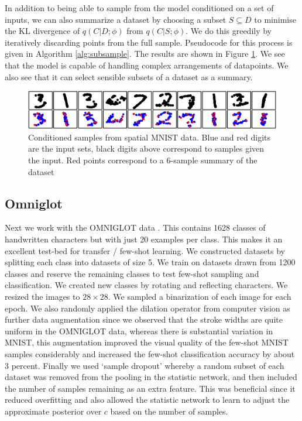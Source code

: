 \documentclass{article} %
\begin{document}
In addition to being able to sample from the model conditioned on a set of inputs, we can also summarize a dataset by choosing a subset $S \subseteq D$ to minimise the KL divergence of $q(C | D ;\phi)$ from $q(C | S; \phi)$. We do this greedily by iteratively discarding points from the full sample. Pseudocode for this process is given in Algorithm \ref{alg:subsample}.
The results are shown in Figure \ref{fig:spatial_mnist_examples}. We see that the model is capable of handling complex arrangements of datapoints. We also see that it can select sensible subsets of a dataset as a summary. 
\begin{figure}
\centering
\includegraphics[width=\linewidth]{spatial_mnist_summary_and_sample.png}
\vspace{-1.5em}
\caption{Conditioned samples from spatial MNIST data. Blue and red digits are the input sets, black digits above correspond to samples given the input. Red points correspond to a $6$-sample summary of the dataset \label{fig:spatial_mnist_examples}}
\end{figure}


\subsection{Omniglot}
Next we work with the OMNIGLOT data \citep{omniglot}. This contains 1628 classes of handwritten characters but with just 20 examples per class. This makes it an excellent test-bed for transfer / few-shot learning. We constructed datasets by splitting each class into datasets of size 5. We train on datasets drawn from 1200 classes and reserve the remaining classes to test few-shot sampling and classification. We created new classes by rotating and reflecting characters. We resized the images to $28 \times 28$. We sampled a binarization of each image for each epoch. We also randomly applied the dilation operator from computer vision as further data augmentation since we observed that the stroke widths are quite uniform in the OMNIGLOT data, whereas there is substantial variation in MNIST, this augmentation improved the visual quality of the few-shot MNIST samples considerably and increased the few-shot classification accuracy by about $3$ percent. Finally we used `sample dropout' whereby a random subset of each dataset was removed from the pooling in the statistic network, and then included the number of samples remaining  as an extra feature. This was beneficial since it reduced overfitting and also allowed the statistic network to learn to adjust the approximate posterior over $c$ based on the number of samples.
\end{document}
